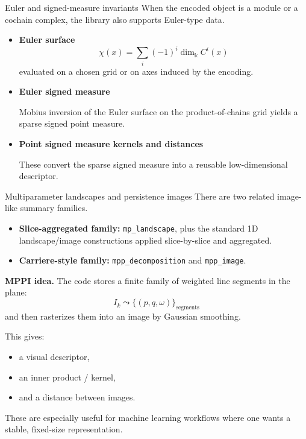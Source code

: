 \documentclass[aspectratio=169,11pt]{beamer}
\newcommand{\kk}{\Bbbk}
\begin{document}
\begin{frame}{Euler and signed-measure invariants}
\small
When the encoded object is a module or a cochain complex, the library also supports Euler-type data.

\begin{itemize}
  \item \textbf{Euler surface}
  \[
    \chi(x)=\sum_i (-1)^i \dim_{\kk} C^i(x)
  \]
  evaluated on a chosen grid or on axes induced by the encoding.
  \item \textbf{Euler signed measure}

  Mobius inversion of the Euler surface on the product-of-chains grid yields a sparse signed point measure.
  \item \textbf{Point signed measure kernels and distances}

  These convert the sparse signed measure into a reusable low-dimensional descriptor.
\end{itemize}

\end{frame}

\begin{frame}{Multiparameter landscapes and persistence images}
\small
There are two related image-like summary families.

\begin{itemize}
  \item \textbf{Slice-aggregated family:} \texttt{mp\_landscape}, plus the standard 1D
  landscape/image constructions applied slice-by-slice and aggregated.
  \item \textbf{Carriere-style family:}
  \texttt{mpp\_decomposition} and \texttt{mpp\_image}.
\end{itemize}

\medskip
\textbf{MPPI idea.}
The code stores a finite family of weighted line segments in the plane:
\[
  I_k \leadsto \{(p,q,\omega)\}_{\text{segments}}
\]
and then rasterizes them into an image by Gaussian smoothing.

\medskip
This gives:
\begin{itemize}
  \item a visual descriptor,
  \item an inner product / kernel,
  \item and a distance between images.
\end{itemize}

These are especially useful for machine learning workflows where one wants a stable, fixed-size representation.
\end{frame}
\end{document}
